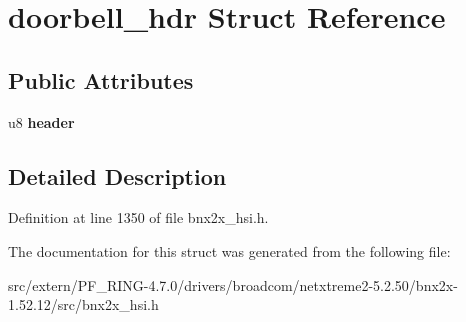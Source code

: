 \hypertarget{structdoorbell__hdr}{
\section{doorbell\_\-hdr Struct Reference}
\label{structdoorbell__hdr}
}
\subsection*{Public Attributes}
\begin{DoxyCompactItemize}
\item 
\hypertarget{structdoorbell__hdr_a71a0c55998424654e9b9d6d496722a5e}{
u8 {\bfseries header}}
\label{structdoorbell__hdr_a71a0c55998424654e9b9d6d496722a5e}

\end{DoxyCompactItemize}


\subsection{Detailed Description}


Definition at line 1350 of file bnx2x\_\-hsi.h.



The documentation for this struct was generated from the following file:\begin{DoxyCompactItemize}
\item 
src/extern/PF\_\-RING-\/4.7.0/drivers/broadcom/netxtreme2-\/5.2.50/bnx2x-\/1.52.12/src/bnx2x\_\-hsi.h\end{DoxyCompactItemize}
